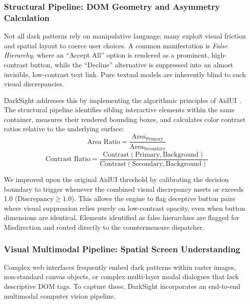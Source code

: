 \documentclass[11pt,a4paper]{article}
\begin{document}
\subsubsection{Structural Pipeline: DOM Geometry and Asymmetry Calculation}
\label{subsubsec:structural_pipeline}

Not all dark patterns rely on manipulative language; many exploit visual friction and spatial layout to coerce user choices. A common manifestation is \textit{False Hierarchy}, where an ``Accept All'' option is rendered as a prominent, high-contrast button, while the ``Decline'' alternative is suppressed into an almost invisible, low-contrast text link. Pure textual models are inherently blind to such visual discrepancies.

DarkSight addresses this by implementing the algorithmic principles of AidUI~\cite{aidui2023}. The structural pipeline identifies sibling interactive elements within the same container, measures their rendered bounding boxes, and calculates color contrast ratios relative to the underlying surface:
\begin{equation}
    \text{Area Ratio} = \frac{\text{Area}_{\text{Primary}}}{\text{Area}_{\text{Secondary}}}
\end{equation}
\begin{equation}
    \text{Contrast Ratio} = \frac{\text{Contrast}(\text{Primary}, \text{Background})}{\text{Contrast}(\text{Secondary}, \text{Background})}
\end{equation}

We improved upon the original AidUI threshold by calibrating the decision boundary to trigger whenever the combined visual discrepancy meets or exceeds 1.0 ($\text{Discrepancy} \ge 1.0$). This allows the engine to flag deceptive button pairs where visual suppression relies purely on low-contrast opacity, even when button dimensions are identical. Elements identified as false hierarchies are flagged for Misdirection and routed directly to the countermeasure dispatcher.

\subsubsection{Visual Multimodal Pipeline: Spatial Screen Understanding}
\label{subsubsec:visual_pipeline}

Complex web interfaces frequently embed dark patterns within raster images, non-standard canvas objects, or complex multi-layer modal dialogues that lack descriptive DOM tags. To capture these, DarkSight incorporates an end-to-end multimodal computer vision pipeline.
\end{document}

